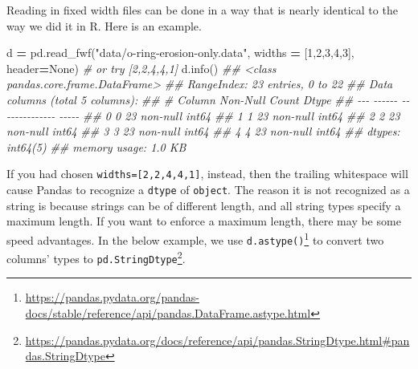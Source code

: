 \documentclass[
  12pt,
  krantz2]{krantz}
\makeatletter
\newenvironment{Shaded}{\begin{snugshade}}{\end{snugshade}}
\newcommand{\CommentTok}[1]{\textcolor[rgb]{0.37,0.37,0.37}{\textit{#1}}}
\newcommand{\DecValTok}[1]{\textcolor[rgb]{0.06,0.06,0.06}{#1}}
\newcommand{\NormalTok}[1]{#1}
\newcommand{\OperatorTok}[1]{\textcolor[rgb]{0.43,0.43,0.43}{\textbf{#1}}}
\newcommand{\StringTok}[1]{\textcolor[rgb]{0.5,0.5,0.5}{#1}}
\newcommand{\VariableTok}[1]{\textcolor[rgb]{0,0,0}{#1}}
\renewcommand{\href}[2]{#2\footnote{\url{#1}}}
\newenvironment{kframe}{%
\medskip{}
\setlength{\fboxsep}{.8em}
 \def\at@end@of@kframe{}%
 \ifinner\ifhmode%
  \def\at@end@of@kframe{\end{minipage}}%
  \begin{minipage}{\columnwidth}%
 \fi\fi%
 \def\FrameCommand##1{\hskip\@totalleftmargin \hskip-\fboxsep
 \colorbox{shadecolor}{##1}\hskip-\fboxsep
     \hskip-\linewidth \hskip-\@totalleftmargin \hskip\columnwidth}%
 \MakeFramed {\advance\hsize-\width
   \@totalleftmargin\z@ \linewidth\hsize
   \@setminipage}}%
 {\par\unskip\endMakeFramed%
 \at@end@of@kframe}
\renewenvironment{Shaded}{\begin{kframe}}{\end{kframe}}
\makeatother
\begin{document}
Reading in fixed width files can be done in a way that is nearly identical to the way we did it in R. Here is an example.

\begin{Shaded}
\begin{Highlighting}[]
\NormalTok{d }\OperatorTok{=}\NormalTok{ pd.read\_fwf(}\StringTok{"data/o{-}ring{-}erosion{-}only.data"}\NormalTok{, }
\NormalTok{                widths }\OperatorTok{=}\NormalTok{ [}\DecValTok{1}\NormalTok{,}\DecValTok{2}\NormalTok{,}\DecValTok{3}\NormalTok{,}\DecValTok{4}\NormalTok{,}\DecValTok{3}\NormalTok{], header}\OperatorTok{=}\VariableTok{None}\NormalTok{) }\CommentTok{\# or try [2,2,4,4,1]}
\NormalTok{d.info()}
\CommentTok{\#\# \textless{}class \textquotesingle{}pandas.core.frame.DataFrame\textquotesingle{}\textgreater{}}
\CommentTok{\#\# RangeIndex: 23 entries, 0 to 22}
\CommentTok{\#\# Data columns (total 5 columns):}
\CommentTok{\#\#  \#   Column  Non{-}Null Count  Dtype}
\CommentTok{\#\# {-}{-}{-}  {-}{-}{-}{-}{-}{-}  {-}{-}{-}{-}{-}{-}{-}{-}{-}{-}{-}{-}{-}{-}  {-}{-}{-}{-}{-}}
\CommentTok{\#\#  0   0       23 non{-}null     int64}
\CommentTok{\#\#  1   1       23 non{-}null     int64}
\CommentTok{\#\#  2   2       23 non{-}null     int64}
\CommentTok{\#\#  3   3       23 non{-}null     int64}
\CommentTok{\#\#  4   4       23 non{-}null     int64}
\CommentTok{\#\# dtypes: int64(5)}
\CommentTok{\#\# memory usage: 1.0 KB}
\end{Highlighting}
\end{Shaded}

If you had chosen \texttt{widths={[}2,2,4,4,1{]}}, instead, then the trailing whitespace will cause Pandas to recognize a \texttt{dtype} of \texttt{object}. The reason it is not recognized as a string is because strings can be of different length, and all string types specify a maximum length. If you want to enforce a maximum length, there may be some speed advantages. In the below example, we use \href{https://pandas.pydata.org/pandas-docs/stable/reference/api/pandas.DataFrame.astype.html}{\texttt{d.astype()}} to convert two columns' types to \href{https://pandas.pydata.org/docs/reference/api/pandas.StringDtype.html\#pandas.StringDtype}{\texttt{pd.StringDtype}}.
\end{document}
